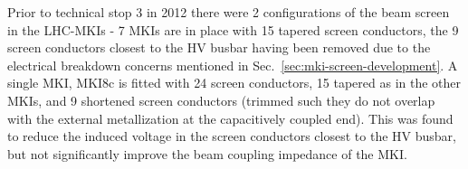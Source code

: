 Prior to technical stop 3 in 2012 there were 2 configurations of the beam screen in the LHC-MKIs - 7 MKIs are in place with 15 tapered screen conductors, the 9 screen conductors closest to the HV busbar having been removed due to the electrical breakdown concerns mentioned in Sec.~\ref{sec:mki-screen-development}. A single MKI, MKI8c is fitted with 24 screen conductors, 15 tapered as in the other MKIs, and 9 shortened screen conductors (trimmed such they do not overlap with the external metallization at the capacitively coupled end). This was found to reduce the induced voltage in the screen conductors closest to the HV busbar, but not significantly improve the beam coupling impedance of the MKI.